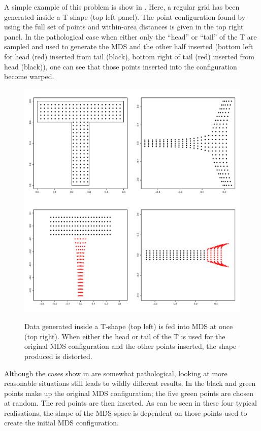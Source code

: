A simple example of this problem is show in . Here, a regular grid has been generated inside a T-shape (top left panel). The point configuration found by using the full set of points and within-area distances is given in the top right panel. In the pathological case when either only the ``head'' or ``tail'' of the T are sampled and used to generate the MDS and the other half inserted (bottom left for head (red) inserted from tail (black), bottom right of tail (red) inserted from head (black)), one can see that those points inserted into the configuration become warped. 

\begin{figure}
\centering
\includegraphics[width=6in]{mds/figs/tshape.pdf} \\
\caption{Data generated inside a T-shape (top left) is fed into MDS at once (top right). When either the head or tail of the T is used for the original MDS configuration and the other points inserted, the shape produced is distorted.}
\label{tshape}
\end{figure}

Although the cases show in  are somewhat pathological, looking at more reasonable situations still leads to wildly different results. In  the black and green points make up the original MDS configuration; the five green points are chosen at random. The red points are then inserted. As can be seen in these four typical realisations, the shape of the MDS space is dependent on those points used to create the initial MDS configuration.

